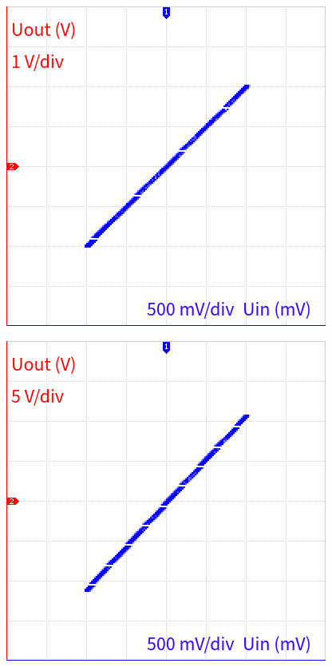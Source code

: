 \documentclass{protokol}
\begin{document}
\begin{figure}
	\centering
\begin{minipage}{.45\textwidth}
	\centering
	\includegraphics[width=\linewidth]{oscilo/output8.png}
	\label{fig:ni-l-prevodni-1k}
\end{minipage}%
\hspace{.09\textwidth}
\begin{minipage}{.45\textwidth}
	\centering
	\includegraphics[width=\linewidth]{oscilo/output9.png}
	\label{ni-l-prevodni-10k}
\end{minipage}
\end{figure}
\end{document}
